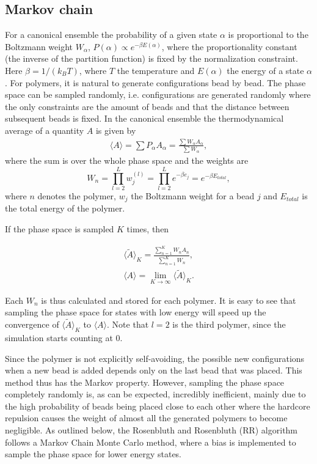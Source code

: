 \subsection{Markov chain}
For a canonical ensemble the probability of a given state $\alpha$ is proportional to the Boltzmann weight $W_\alpha$, $P(\alpha) \propto e^{-\beta E(\alpha)}$, where the proportionality constant (the inverse of the partition function) is fixed by the normalization constraint.  Here $\beta=1/\left(k_B T\right)$, where $T$ the temperature and $E(\alpha)$ the energy of a state $\alpha$. For polymers, it is natural to generate configurations bead by bead. The phase space can be sampled randomly, i.e. configurations are generated randomly where the only constraints are the amount of beads and that the distance between subsequent beads is fixed.
In the canonical ensemble the thermodynamical average of a quantity $A$ is given by
\begin{gather}
	\langle A \rangle = \sum P_\alpha A_{\alpha} = \frac{\sum W_\alpha A_{\alpha}}{\sum W_{\alpha}},
\end{gather}
where the sum is over the whole phase space and the weights are
\begin{equation}
    W_n = \prod_{l=2}^L w_j^{(l)} = \prod_{l=2}^Le^{-\beta e_j} = e^{-\beta E_{total}},
\end{equation} where $n$ denotes the polymer, $w_j$ the Boltzmann weight for a bead $j$ and $E_{total}$ is the total energy of the polymer. 

 If the phase space is sampled $K$ times, then

\begin{gather}
	\langle \tilde{A} \rangle_{K} = \frac{\sum_{n=1}^K W_n A_n}{\sum_{n=1}^K W_n},\\
	\langle A \rangle = \lim_{K\rightarrow \infty}\langle \tilde{A} \rangle_{K}.
\end{gather}

Each $W_n$ is thus calculated and stored for each polymer. It is easy to see that sampling the phase space for states with low energy will speed up the convergence of $\langle \tilde{A} \rangle_{K}$ to $	\langle A \rangle$. Note that $l=2$ is the third polymer, since the simulation starts counting at $0$.

Since the polymer is not explicitly self-avoiding, the possible new configurations when a new bead is added depends only on the last bead that was placed. This method thus has the Markov property. However, sampling the phase space completely randomly is, as can be expected, incredibly inefficient, mainly due to the high probability of beads being placed close to each other where the hardcore repulsion causes the weight of almost all the generated polymers to become negligible. As outlined below, the Rosenbluth and Rosenbluth (RR) algorithm \cite{rosenbluth1955monte} follows a Markov Chain Monte Carlo method, where a bias is implemented to sample the phase space for lower energy states.




